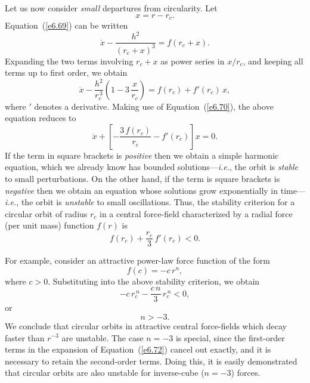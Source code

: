 Let us now consider {\em small}\/ departures from circularity. Let
\begin{equation}
x = r - r_c.
\end{equation}
Equation~(\ref{e6.69}) can be written
\begin{equation}\label{e6.72}
\ddot{x} - \frac{h^2}{(r_c+x)^3} = f(r_c+x).
\end{equation}
Expanding the two terms involving $r_c+x$ as power series in $x/r_c$,
and keeping all terms up to first order, we obtain
\begin{equation}
\ddot{x} - \frac{h^2}{r_c^{\,3}}\left(1-3\,\frac{x}{r_c}\right)=
f(r_c) + f'(r_c)\,x,
\end{equation}
where $'$ denotes a derivative. Making use of Equation~(\ref{e6.70}), 
the above equation reduces to
\begin{equation}\label{e6.74}
\ddot{x} + \left[-\frac{3\,f(r_c)}{r_c} - f'(r_c)\right] x = 0.
\end{equation}
If the term in square brackets is {\em positive}\/ then we obtain a simple harmonic
equation, which we already know has bounded solutions---{\em i.e.}, the orbit is {\em stable}\/ to small  perturbations. On the other hand,
if the term is square brackets is {\em negative} then we obtain an equation
whose solutions grow exponentially in time---{\em i.e.}, the orbit
is {\em unstable}\/ to small oscillations. Thus, the stability criterion for a circular
orbit of radius $r_c$ in a central force-field characterized by a radial force 
(per unit mass) function $f(r)$ is
\begin{equation}
f(r_c) + \frac{r_c}{3}\,f'(r_c)<0.
\end{equation}

For example, consider an attractive power-law force function of the form
\begin{equation}
f(c) = -c\,r^n,
\end{equation}
where $c>0$. Substituting into the above stability criterion, we obtain
\begin{equation}
-c\,r_c^{\,n} -\frac{c\,n}{3}\,r_c^{\,n} < 0,
\end{equation}
or 
\begin{equation}
n > -3.
\end{equation}
We conclude that circular orbits in attractive central force-fields which decay
faster than $r^{-3}$ are unstable. The case $n =-3$ is special, since the first-order terms in the expansion of Equation~(\ref{e6.72}) cancel out exactly, and it
is necessary  to retain the second-order terms. Doing this, it
is easily demonstrated that circular orbits are also unstable for
inverse-cube ($n=-3$) forces. 

